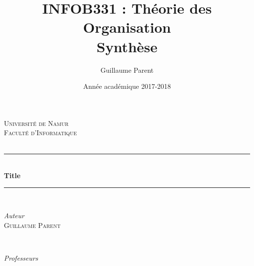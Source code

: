 \documentclass[12pt,a4paper]{report}
\author{Guillaume Parent}
\title{INFOB331 : Théorie des Organisation\\Synthèse}
\date{Année académique 2017-2018}
\begin{document}
	
	\begin{titlepage} %
		\newcommand{\HRule}{\rule{\linewidth}{0.5mm}} %
		
		\centering %
		
		
		\textsc{\LARGE Université de Namur\\Faculté d'Informatique}\\[1.5cm] %
		
		\textsc{\Large }\\[0.5cm] %
		
		
		
		\HRule\\[0.4cm]
		
		{\huge\bfseries Title}\\[0.4cm] %
		
		\HRule\\[1.5cm]
		
		
			\begin{minipage}{0.4\textwidth}
				\begin{flushleft}
					\large
					\textit{Auteur}\\
					\textsc{Guillaume Parent} %
				\end{flushleft}
			\end{minipage}
			~
			\begin{minipage}{0.4\textwidth}
				\begin{flushright}
					\large
					\textit{Professeurs}\\
				\end{flushright}
			\end{minipage}
		
		

\end{titlepage}
\end{document}

